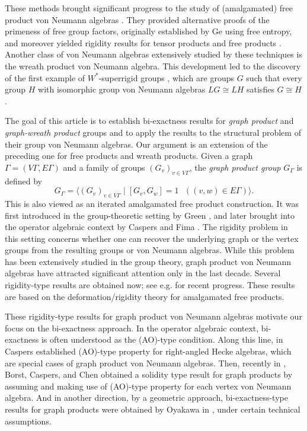 \documentclass{amsart}
\theoremstyle{definition}
\begin{document}
These methods brought significant progress to the study of
 (amalgamated) free product von Neumann algebras \cite{ipp, oza1}.  
They provided alternative proofs of the primeness of free group factors, originally established by Ge \cite{ge} using free entropy, and moreover yielded rigidity results for tensor products and free products 
\cite{ipp, op, oza2}. 
Another class of von Neumann algebras extensively studied by these techniques is the wreath product von Neumann algebra.  
This development led to the discovery of the first example of $W^{\ast}$-superrigid groups \cite{ipv}, which are groups $G$ such that every group $H$ with isomorphic group von Neumann algebras $LG\cong LH$ satisfies $G\cong H$. 


The goal of this article is to establish bi-exactness results for \emph{graph product} and \emph{graph-wreath product} groups and to apply the results to the structural problem of their group
von Neumann algebras.
Our argument is an extension of the preceding one for free products and wreath products. 
Given a graph $\Gamma =(V\Gamma, E\Gamma) $
and a family of groups $(G_v)_{v\in V\Gamma}$, 
the \emph{graph product group} $G_{\Gamma}$ is defined by
\[
G_{\Gamma} = \langle (G_v)_{v\in V\Gamma} \mid [G_v, G_w]= 1 \text{ }((v,w)\in E\Gamma) \rangle. 
\]
This is also viewed as 
an iterated amalgamated free product construction. 
It was first introduced in the group-theoretic setting by Green \cite{gre}, and later brought into the operator algebraic context by Caspers and Fima \cite{cf}. 
The rigidity problem in this setting concerns 
whether one can recover the underlying graph or the vertex groups 
from the resulting groups or von Neumann algebras. 
While this problem has been extensively studied in the group theory, 
graph product von Neumann algebras have attracted significant attention only in the last decade. Several rigidity-type results are obtained now; 
see e.g.\@ \cite{cdd1, cdd2, dv, hi} for recent progress. 
These results are based on 
the deformation/rigidity theory for amalgamated free products. 

These rigidity-type results for graph product von Neumann algebras
motivate our focus on the bi-exactness approach. 
In the operator algebraic context, 
bi-exactness is often understood as the
(AO)-type condition. 
Along this line, in \cite{cas}
Caspers established (AO)-type property for right-angled Hecke algebras, 
which are special cases of graph product von Neumann algebras. 
Then, recently in \cite[Section 6.2]{bcc}, Borst, Caspers, and Chen obtained 
a solidity type result for graph products by assuming and making use of
(AO)-type property for each vertex von Neumann algebra. 
And in another direction, by a geometric approach, 
bi-exactness-type results for graph products 
were obtained by Oyakawa in \cite[Theorem 4.9, 5.7]{oya2}, under certain technical assumptions.
\end{document}
